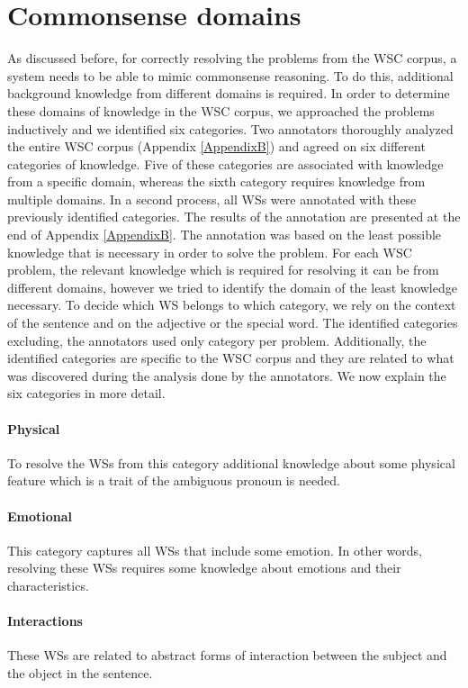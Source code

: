 \section{Commonsense domains}
As discussed before, for correctly resolving the problems from the WSC corpus, a system needs to be able to mimic commonsense reasoning. To do this, additional background knowledge from different domains is required. In order to determine these domains of knowledge in the WSC corpus, we approached the problems inductively and we identified six categories. Two annotators thoroughly analyzed the entire WSC corpus (Appendix \ref{AppendixB}) and agreed on six different categories of knowledge. Five of these categories are associated with knowledge from a specific domain, whereas the sixth category requires knowledge from multiple domains.
In a second process, all WSs were annotated with these previously identified categories. The results of the annotation are presented at the end of Appendix \ref{AppendixB}. The annotation was based on the least possible knowledge that is necessary in order to solve the problem. For each WSC problem, the relevant knowledge which is required for resolving  it can be from different domains, however we tried to identify the domain of the least knowledge necessary. To decide which WS belongs to which category, we rely on the context of the sentence and on the adjective or the special word. The identified categories excluding, the annotators used only category per problem. Additionally, the identified categories are specific to the WSC corpus and they are related to what was discovered during the analysis done by the annotators. We now explain the six categories in more detail. 

\paragraph{Physical} To resolve the WSs from this category additional knowledge about some physical feature which is a trait of the ambiguous pronoun is needed.
 
\paragraph{Emotional} This category captures all WSs that include some emotion. In other words, resolving these WSs requires some knowledge about emotions and their characteristics.

\paragraph{Interactions} These WSs are related to abstract forms of interaction between the subject and the object in the sentence.

